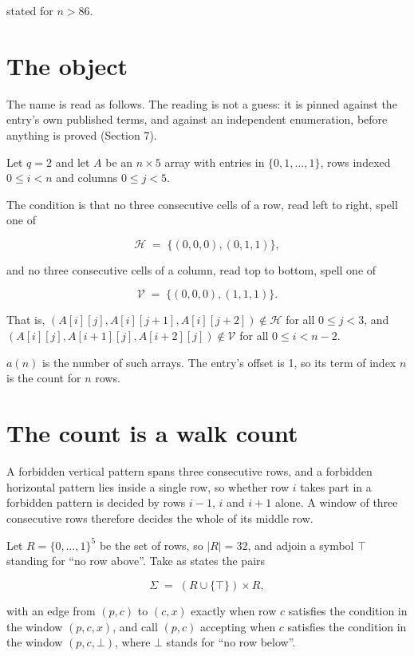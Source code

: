 \documentclass[11pt]{article}
\theoremstyle{definition}
\begin{document}
stated for $n > 86$.

\section{The object}

The name is read as follows. The reading is not a guess: it is pinned against the entry's own published terms, and against an independent enumeration, before anything is proved (Section 7).

Let $q = 2$ and let $A$ be an $n \times 5$ array with entries in $\{0,1,\dots,1\}$, rows indexed $0 \le i < n$ and columns $0 \le j < 5$.

The condition is that no three consecutive cells of a row, read left to right, spell one of

\[\mathcal{H} \;=\; \{(0,0,0), (0,1,1)\},\]

and no three consecutive cells of a column, read top to bottom, spell one of

\[\mathcal{V} \;=\; \{(0,0,0), (1,1,1)\}.\]

That is, $(A[i][j],A[i][j{+}1],A[i][j{+}2]) \notin \mathcal{H}$ for all $0 \le j < 3$, and $(A[i][j],A[i{+}1][j],A[i{+}2][j]) \notin \mathcal{V}$ for all $0 \le i < n-2$.

$a(n)$ is the number of such arrays. The entry's offset is 1, so its term of index $n$ is the count for $n$ rows.

\section{The count is a walk count}

A forbidden vertical pattern spans three consecutive rows, and a forbidden horizontal pattern lies inside a single row, so whether row $i$ takes part in a forbidden pattern is decided by rows $i-1$, $i$ and $i+1$ alone. A window of three consecutive rows therefore decides the whole of its middle row.

Let $R = \{0,\dots,1\}^{5}$ be the set of rows, so $|R| = 32$, and adjoin a symbol $\top$ standing for ``no row above''. Take as states the pairs

\[\Sigma \;=\; (R \cup \{\top\}) \times R,\]

with an edge from $(p,c)$ to $(c,x)$ exactly when row $c$ satisfies the condition in the window $(p,c,x)$, and call $(p,c)$ accepting when $c$ satisfies the condition in the window $(p,c,\bot)$, where $\bot$ stands for ``no row below''.
\end{document}
